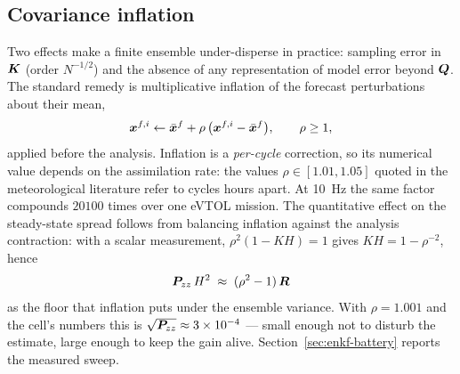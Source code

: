 \subsection{Covariance inflation}
Two effects make a finite ensemble under-disperse in practice: sampling error in $\bm{K}$ (order
$N^{-1/2}$) and the absence of any representation of model error beyond $\bm{Q}$.  The standard remedy
\cite{anderson1999inflation} is multiplicative inflation of the forecast perturbations about their
mean,
\begin{equation}
  \bm{x}^{f,i} \leftarrow \bar{\bm{x}}^f + \rho\,\big(\bm{x}^{f,i} - \bar{\bm{x}}^f\big), \qquad \rho \ge 1,
  \label{eq:enkf-inflation}
\end{equation}
applied before the analysis.  Inflation is a \emph{per-cycle} correction, so its numerical value
depends on the assimilation rate: the values $\rho \in [1.01, 1.05]$ quoted in the meteorological
literature refer to cycles hours apart.  At \SI{10}{\hertz} the same factor compounds
$\num{20100}$ times over one eVTOL mission.  The quantitative effect on the steady-state spread
follows from balancing inflation against the analysis contraction: with a scalar measurement,
$\rho^2(1 - KH) = 1$ gives $KH = 1-\rho^{-2}$, hence
\begin{equation}
  \bm{P}_{zz}\,H^2 \;\approx\; (\rho^2-1)\,\bm{R}
  \label{eq:enkf-inflation-balance}
\end{equation}
as the floor that inflation puts under the ensemble variance.  With $\rho = 1.001$ and the cell's
numbers this is $\sqrt{\bm{P}_{zz}} \approx 3\times10^{-4}$ --- small enough not to disturb the
estimate, large enough to keep the gain alive.  Section~\ref{sec:enkf-battery} reports the measured
sweep.

